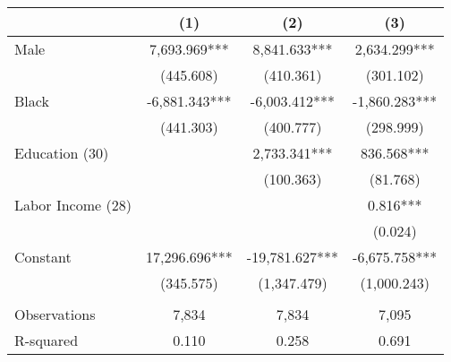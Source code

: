 \begin{tabular}{lccc} \toprule
 & (1) & (2) & (3) \\ \midrule
Male & 7,693.969*** & 8,841.633*** & 2,634.299*** \\
 & (445.608) & (410.361) & (301.102) \\
Black & -6,881.343*** & -6,003.412*** & -1,860.283*** \\
 & (441.303) & (400.777) & (298.999) \\
Education (30) &  & 2,733.341*** & 836.568*** \\
 &  & (100.363) & (81.768) \\
Labor Income (28) &  &  & 0.816*** \\
 &  &  & (0.024) \\
Constant & 17,296.696*** & -19,781.627*** & -6,675.758*** \\
 & (345.575) & (1,347.479) & (1,000.243) \\ \\ \midrule
Observations & 7,834 & 7,834 & 7,095 \\
 R-squared & 0.110 & 0.258 & 0.691 \\ \bottomrule
\end{tabular}
